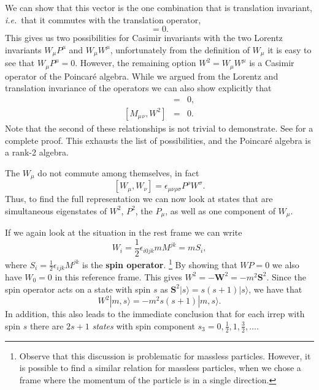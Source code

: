 \documentclass[notes.tex]{subfiles}
\begin{document}
We can show that this vector is the one combination that is translation invariant, {\it i.e.}\ that it commutes with the translation operator,
\begin{equation}
[P_\mu, W_\nu]=0.
\label{eq:PW_commutator}
\end{equation}
This gives us two possibilities for Casimir invariants with the two Lorentz invariants $W_\mu P^\mu$ and $W_\mu W^\mu$, unfortunately from the definition of $W_\mu$ it is easy to see that  $W_\mu P^\mu=0$. However, the remaining option $W^2 = W_\mu W^\mu$ is a Casimir operator of the Poincaré algebra. While we argued from the Lorentz and translation invariance of the operators we can also show explicitly that
\begin{eqnarray}
[P_\mu, W^2] &=& 0,\\
{[M_\mu{}_\nu, W^2]} &=& 0.
\end{eqnarray}
Note that the second of these relationships is not trivial to demonstrate. See \cite{IntrSUSY2010} for a complete proof. This exhausts the list of possibilities, and the Poincaré algebra is a rank-2 algebra.

The $W_\mu$ do not commute among themselves, in fact 
\[ [W_\mu,W_\nu]=\epsilon_{\mu\nu\rho\sigma}P^\rho W^\sigma. \]
Thus, to find the full representation we can now look at states that are simultaneous eigenstates of $W^2$, $P^2$, the $P_\mu$, as well as one component of $W_\mu$. 

If we again look at the situation in the rest frame we can write 
\begin{equation}W_i = \frac{1}{2} \epsilon_{i 0 jk}m M^{jk} = mS_i,
\label{eq:PL_restframe}
\end{equation}
where $S_i = \frac{1}{2} \epsilon_{ijk} M^{jk}$ is the {\bf spin operator}. \footnote{Observe that this discussion is problematic for massless particles. However, it is possible to find a similar relation for massless particles, when we chose a frame where the momentum of the particle is in a single direction.}
By showing that $WP=0$ we also have $W_0 = 0$ in this reference frame. This gives $W^2 = -\mathbf W^2 = -m^2\mathbf S^2$. Since the spin operator acts on a state with spin $s$ as $\mathbf S^2| s\rangle=s(s+1)| s\rangle$, we have that
\[W^2|m,s\rangle = -m^2 s(s+1)|m,s\rangle.\]
In addition, this also leads to the immediate conclusion that for each irrep with spin $s$ there are $2s+1$ {\it states} with spin component $s_3=0,\frac{1}{2},1,\frac{3}{2},\ldots$.
\end{document}
